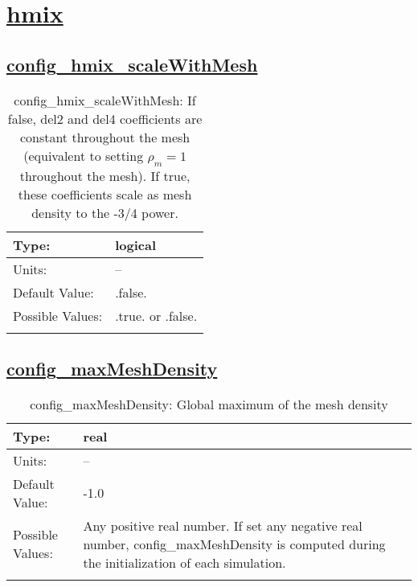 \section[hmix]{\hyperref[sec:nm_tab_hmix]{hmix}}
\label{sec:nm_sec_hmix}
\subsection[config\_hmix\_scaleWithMesh]{\hyperref[sec:nm_tab_hmix]{config\_hmix\_scaleWithMesh}}
\label{subsec:nm_sec_config_hmix_scaleWithMesh}
\begin{center}
\begin{longtable}{| p{2.0in} || p{4.0in} |}
    \hline
    Type: & logical \\
    \hline
    Units: & -- \\
    \hline
    Default Value: & .false. \\
    \hline
    Possible Values: & .true. or .false. \\
    \hline
    \caption{config\_hmix\_scaleWithMesh: If false, del2 and del4 coefficients are constant throughout the mesh (equivalent to setting $\rho_m=1$ throughout the mesh).  If true, these coefficients scale as mesh density to the -3/4 power.}
\end{longtable}
\end{center}
\subsection[config\_maxMeshDensity]{\hyperref[sec:nm_tab_hmix]{config\_maxMeshDensity}}
\label{subsec:nm_sec_config_maxMeshDensity}
\begin{center}
\begin{longtable}{| p{2.0in} || p{4.0in} |}
    \hline
    Type: & real \\
    \hline
    Units: & -- \\
    \hline
    Default Value: & -1.0 \\
    \hline
    Possible Values: & Any positive real number. If set any negative real number, config\_maxMeshDensity is computed during the initialization of each simulation. \\
    \hline
    \caption{config\_maxMeshDensity: Global maximum of the mesh density}
\end{longtable}
\end{center}
